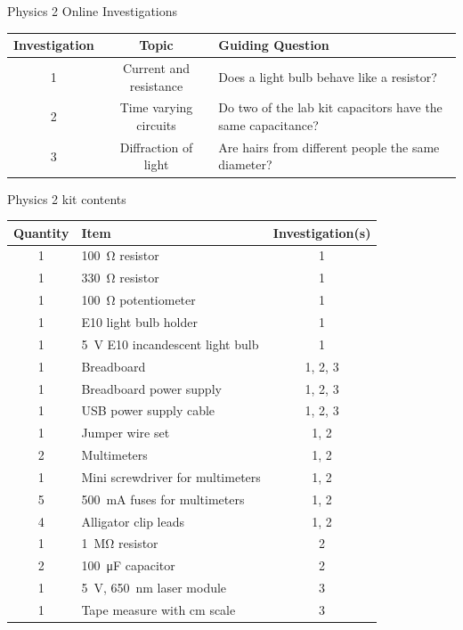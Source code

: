 \documentclass[xcolor=dvipsnames,table]{beamer}
\begin{document}
\begin{frame}
  {Physics 2 Online Investigations}
  \begin{center}
    \begin{tabular}{ccp{12em}}
      \hline\hline
      Investigation & Topic & Guiding Question\\
      \hline
      1 & Current and resistance & Does a light bulb behave like a resistor? \\
      2 & Time varying circuits & Do two of the lab kit capacitors have the same capacitance? \\
      3 & Diffraction of light & Are hairs from different people the same diameter? \\
      \hline\hline
    \end{tabular}
  \end{center}
\end{frame}

\begin{frame}{Physics 2 kit contents}
  \begin{center}\scriptsize
    \begin{tabular}{clc}
      \hline\hline
      Quantity & Item & Investigation(s)\\
      \hline
      1 & \SI{100}{\ohm} resistor & 1 \\
      1 & \SI{330}{\ohm} resistor & 1 \\
      1 & \SI{100}{\ohm} potentiometer & 1 \\
      1 & E10 light bulb holder & 1 \\
      1 & \SI{5}{V} E10 incandescent light bulb & 1 \\
      1 & Breadboard & 1, 2, 3 \\
      1 & Breadboard power supply & 1, 2, 3 \\
      1 & USB power supply cable & 1, 2, 3 \\
      1 & Jumper wire set & 1, 2 \\
      2 & Multimeters & 1, 2 \\
      1 & Mini screwdriver for multimeters & 1, 2 \\
      5 & \SI{500}{mA} fuses for multimeters & 1, 2 \\
      4 & Alligator clip leads & 1, 2 \\
      1 & \SI{1}{\mega\ohm} resistor & 2 \\
      2 & \SI{100}{\micro\farad} capacitor & 2 \\
      1 & \SI{5}{V}, \SI{650}{nm} laser module & 3 \\
      1 & Tape measure with cm scale & 3 \\            
      \hline\hline
    \end{tabular}
  \end{center}

\end{frame}
\end{document}
